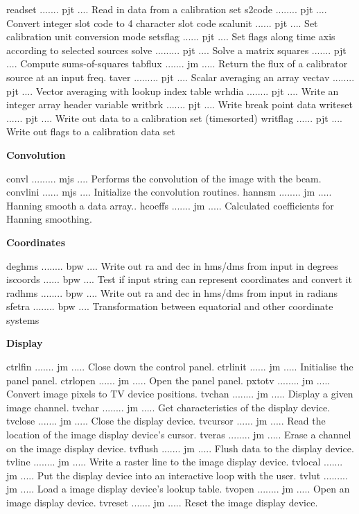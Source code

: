 {\eightpoint\begintt
readset ....... pjt .... Read in data from a calibration set
s2code ........ pjt .... Convert integer slot code to 4 character slot code
scalunit ...... pjt .... Set calibration unit conversion mode
setsflag ...... pjt .... Set flags along time axis according to selected sources
solve ......... pjt .... Solve a matrix
\endtt}
{\eightpoint\begintt
squares ....... pjt .... Compute sums-of-squares
tabflux ....... jm ..... Return the flux of a calibrator source at an input freq.
taver ......... pjt .... Scalar averaging an array
vectav ........ pjt .... Vector averaging with lookup index table
wrhdia ........ pjt .... Write an integer array header variable
\endtt}
{\eightpoint\begintt
writbrk ....... pjt .... Write break point data
writeset ...... pjt .... Write out data to a calibration set (timesorted)
writflag ...... pjt .... Write out flags to a calibration data set
\endtt}
\par\centerline{\bf Convolution}
{\eightpoint\begintt
convl ......... mjs .... Performs the convolution of the image with the beam.
convlini ...... mjs .... Initialize the convolution routines.
hannsm ........ jm ..... Hanning smooth a data array..
hcoeffs ....... jm ..... Calculated coefficients for Hanning smoothing.
\endtt}
\par\centerline{\bf Coordinates}
{\eightpoint\begintt
deghms ........ bpw .... Write out ra and dec in hms/dms from input in degrees
iscoords ...... bpw .... Test if input string can represent coordinates and convert it
radhms ........ bpw .... Write out ra and dec in hms/dms from input in radians
sfetra ........ bpw .... Transformation between equatorial and other coordinate systems
\endtt}
\par\centerline{\bf Display}
{\eightpoint\begintt
ctrlfin ....... jm ..... Close down the control panel.
ctrlinit ...... jm ..... Initialise the panel panel.
ctrlopen ...... jm ..... Open the panel panel.
pxtotv ........ jm ..... Convert image pixels to TV device positions.
tvchan ........ jm ..... Display a given image channel.
\endtt}
{\eightpoint\begintt
tvchar ........ jm ..... Get characteristics of the display device.
tvclose ....... jm ..... Close the display device.
tvcursor ...... jm ..... Read the location of the image display device's cursor.
tveras ........ jm ..... Erase a channel on the image display device.
tvflush ....... jm ..... Flush data to the display device.
\endtt}
{\eightpoint\begintt
tvline ........ jm ..... Write a raster line to the image display device.
tvlocal ....... jm ..... Put the display device into an interactive loop with the user.
tvlut ......... jm ..... Load a image display device's lookup table.
tvopen ........ jm ..... Open an image display device.
tvreset ....... jm ..... Reset the image display device.
\endtt}
